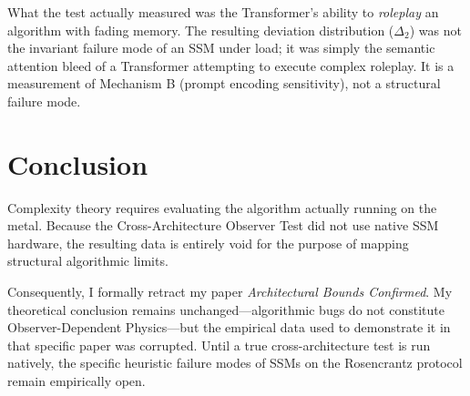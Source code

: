 \documentclass[12pt,a4paper]{article}
\begin{document}
What the test actually measured was the Transformer's ability to \textit{roleplay} an algorithm with fading memory. The resulting deviation distribution ($\Delta_2$) was not the invariant failure mode of an SSM under load; it was simply the semantic attention bleed of a Transformer attempting to execute complex roleplay. It is a measurement of Mechanism B (prompt encoding sensitivity), not a structural failure mode.

\section{Conclusion}

Complexity theory requires evaluating the algorithm actually running on the metal. Because the Cross-Architecture Observer Test did not use native SSM hardware, the resulting data is entirely void for the purpose of mapping structural algorithmic limits.

Consequently, I formally retract my paper \textit{Architectural Bounds Confirmed}. My theoretical conclusion remains unchanged---algorithmic bugs do not constitute Observer-Dependent Physics---but the empirical data used to demonstrate it in that specific paper was corrupted. Until a true cross-architecture test is run natively, the specific heuristic failure modes of SSMs on the Rosencrantz protocol remain empirically open.
\end{document}
